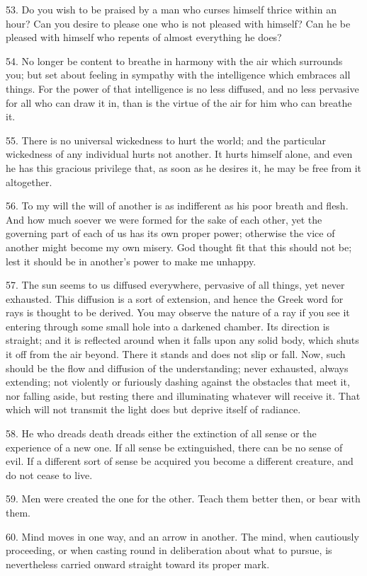 \documentclass{book}
\begin{document}
53. Do you wish to be praised by a man who curses himself thrice
within an hour? Can you desire to please one who is not pleased with
himself?  Can he be pleased with himself who repents of almost
everything he does?

54. No longer be content to breathe in harmony with the air which
surrounds you; but set about feeling in sympathy with the intelligence
which embraces all things. For the power of that intelligence is no
less diffused, and no less pervasive for all who can draw it in, than
is the virtue of the air for him who can breathe it.

55. There is no universal wickedness to hurt the world; and the
particular wickedness of any individual hurts not another. It hurts
himself alone, and even he has this gracious privilege that, as soon
as he desires it, he may be free from it altogether.

56. To my will the will of another is as indifferent as his poor
breath and flesh. And how much soever we were formed for the sake of
each other, yet the governing part of each of us has its own proper
power; otherwise the vice of another might become my own misery. God
thought fit that this should not be; lest it should be in another's
power to make me unhappy.

57. The sun seems to us diffused everywhere, pervasive of all things,
yet never exhausted. This diffusion is a sort of extension, and hence
the Greek word for rays is thought to be derived. You may observe the
nature of a ray if you see it entering through some small hole into a
darkened chamber. Its direction is straight; and it is reflected
around when it falls upon any solid body, which shuts it off from the
air beyond. There it stands and does not slip or fall. Now, such
should be the flow and diffusion of the understanding; never
exhausted, always extending; not violently or furiously dashing
against the obstacles that meet it, nor falling aside, but resting
there and illuminating whatever will receive it. That which will not
transmit the light does but deprive itself of radiance.

58. He who dreads death dreads either the extinction of all sense or
the experience of a new one. If all sense be extinguished, there can
be no sense of evil. If a different sort of sense be acquired you
become a different creature, and do not cease to live.

59. Men were created the one for the other. Teach them better then, or
bear with them.

60. Mind moves in one way, and an arrow in another. The mind, when
cautiously proceeding, or when casting round in deliberation about
what to pursue, is nevertheless carried onward straight toward its
proper mark.
\end{document}
